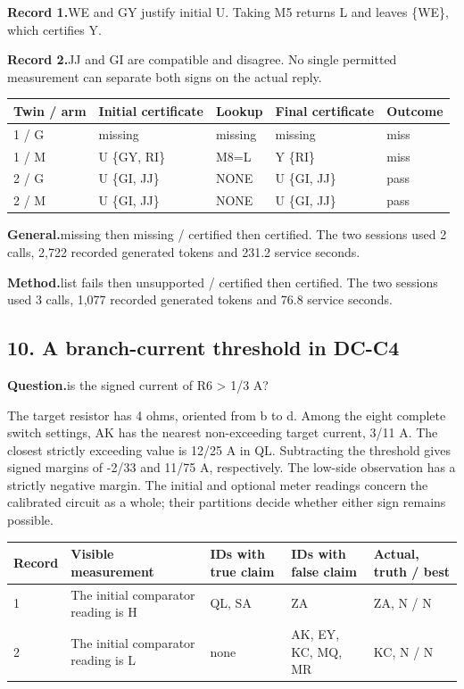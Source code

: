 \documentclass[12pt,letterpaper]{article}
\newcommand{\dossier}[2]{\clearpage\subsection*{#1}\phantomsection\label{#2}}
\newcommand{\reading}[2]{\par\smallskip\textsf{\color{accent}\bfseries #1}\enspace #2\par}
\begin{document}
\reading{Record 1.}{WE and GY justify initial U. Taking M5 returns L and leaves \{WE\}, which certifies Y.}

\reading{Record 2.}{JJ and GI are compatible and disagree. No single permitted measurement can separate both signs on the actual reply.}

\begin{center}\footnotesize\setlength{\tabcolsep}{4pt}\begin{tabularx}{\linewidth}{lYlYl}\toprule
Twin / arm & Initial certificate & Lookup & Final certificate & Outcome\\ / G & missing & missing & missing & miss\\
1 / M & U \{GY, RI\} & M8=L & Y \{RI\} & miss\\
2 / G & U \{GI, JJ\} & NONE & U \{GI, JJ\} & pass\\
2 / M & U \{GI, JJ\} & NONE & U \{GI, JJ\} & pass\\
\bottomrule\end{tabularx}\end{center}


\reading{General.}{missing then missing / certified then certified. The two sessions used 2 calls, 2,722 recorded generated tokens and 231.2 service seconds.}

\reading{Method.}{list fails then unsupported / certified then certified. The two sessions used 3 calls, 1,077 recorded generated tokens and 76.8 service seconds.}

\dossier{10. A branch-current threshold in DC-C4}{case10}

\reading{Question.}{is the signed current of R6 \textgreater{} 1/3 A?}

The target resistor has 4 ohms, oriented from b to d. Among the eight complete switch settings, AK has the nearest non-exceeding target current, 3/11 A. The closest strictly exceeding value is 12/25 A in QL. Subtracting the threshold gives signed margins of -2/33 and 11/75 A, respectively. The low-side observation has a strictly negative margin. The initial and optional meter readings concern the calibrated circuit as a whole; their partitions decide whether either sign remains possible.

\begin{center}\footnotesize\setlength{\tabcolsep}{4pt}\begin{tabularx}{\linewidth}{lYYYl}\toprule
Record & Visible measurement & IDs with true claim & IDs with false claim & Actual, truth / best\\ & The initial comparator reading is H & QL, SA & ZA & ZA, N / N\\
2 & The initial comparator reading is L & none & AK, EY, KC, MQ, MR & KC, N / N\\
\bottomrule\end{tabularx}\end{center}
\end{document}
